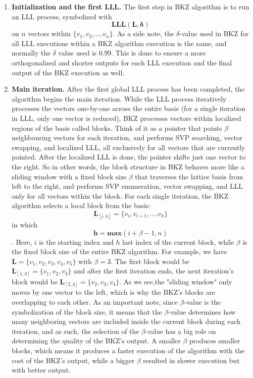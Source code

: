 \begin{enumerate}
    \item \textbf{Initialization and the first LLL.} The first step in BKZ algorithm is to run an LLL process, symbolized with $$\mathbf{LLL(L, \delta)}$$ on $n$ vectors within ${\{v_1, v_2, ....v_n\}}$. As a side note, the $\delta$-value used in BKZ for all LLL executions within a BKZ algorithm execution is the same, and normally the $\delta$ value used is 0.99. This is done to ensure a more orthogonalized and shorter outputs for each LLL execution and the final output of the BKZ execution as well.
    \item \textbf{Main iteration.} After the first global LLL process has been completed, the algorithm begins the main iteration. While the LLL process iteratively processes the vectors one-by-one across the entire basis (for a single iteration in LLL, only one vector is reduced), BKZ processes vectors within localized regions of the basis called blocks. Think of it as a pointer that points $\beta$ neighbouring vectors for each iteration, and performs SVP searching, vector swapping, and localized LLL, all exclusively for all vectors that are currently pointed. After the localized LLL is done, the pointer shifts just one vector to the right. So in other words, the block structure in BKZ behaves more like a sliding window with a fixed block size $\beta$ that traverses the lattice basis from left to the right, and performs SVP enumeration, vector swapping, and LLL only for all vectors within the block. For each single iteration, the BKZ algorithm selects a local block from the basis:$$\mathbf{L}_{[i,h]} = \{v_i, v_{i+1}, ....v_h\}$$ in which $$\mathbf{h} = \mathbf{max}(i+\beta-1, n)$$. Here, $i$ is the starting index and $h$ last index of the current block, while $\beta$ is the fixed block size of the entire BKZ algorithm. For example, we have $\mathbf{L} = \{v_1, v_2, v_3, v_4, v_5\}$ with $\beta = 3$. The first block would be $\mathbf{L}_{[1,3]} = \{v_1, v_2, v_3\}$ and after the first iteration ends, the next iteration's block would be $\mathbf{L}_{[2,4]} = \{v_2, v_3, v_4\}$. As we see,the "sliding window" only moves by one vector to the left, which is why the BKZ's blocks are overlapping to each other. As an important note, since $\beta$-value is the symbolization of the block size, it means that the $\beta$-value determines how many neighboring vectors are included inside the current block during each iteration, and as such, the selection of the $\beta$-value has a big role on determining the quality of the BKZ's output. A smaller $\beta$ produces smaller blocks, which means it produces a faster execution of the algorithm with the cost of the BKZ's output, while a bigger $\beta$ resulted in slower execution but with better output.

\end{enumerate}
